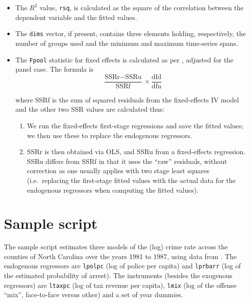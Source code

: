\documentclass{article}
\begin{document}
\begin{itemize}

\item The $R^2$ value, \texttt{rsq}, is calculated as the square of the
  correlation between the dependent variable and the fitted values.

\item The \texttt{dims} vector, if present, contains three elements
  holding, respectively, the number of groups used and the minimum and
  maximum time-series spans.

\item The \texttt{Fpool} statistic for fixed effects is calculated as
  per \cite{wooldridge90}, adjusted for the panel case. The formula is
\[
 \frac{\mbox{SSRr} - \mbox{SSRu}}{\mbox{SSRf}} \times 
  \frac{\mbox{dfd}}{\mbox{dfn}}
\]

 where SSRf is the sum of squared residuals from the fixed-effects IV
 model and the other two SSR values are calculated thus:
\begin{enumerate}
\item We run the fixed-effects first-stage regressions and save the
  fitted values; we then use these to replace the endogenous
  regressors.
\item SSRr is then obtained via OLS, and SSRu from a fixed-effects
  regression. SSRu differs from SSRf in that it uses the ``raw''
  residuals, without correction as one usually applies with two stage
  least squares (i.e.\ replacing the first-stage fitted values with
  the actual data for the endogenous regressors when computing the
  fitted values).
\end{enumerate}

\end{itemize}

\section{Sample script}

The sample script estimates three models of the (log) crime rate
across the counties of North Carolina over the years 1981 to 1987,
using data from \cite{cornwell94}. The endogenous regressors are
\texttt{lpolpc} (log of police per capita) and \texttt{lprbarr} (log
of the estimated probability of arrest). The instruments (besides the
exogenous regressors) are \texttt{ltaxpc} (log of tax revenue per
capita), \texttt{lmix} (log of the offense ``mix'', face-to-face
versus other) and a set of year dummies. 
\end{document}
